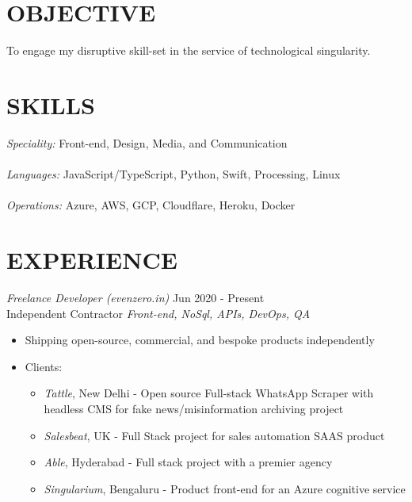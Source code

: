 \documentclass[margin, 10pt]{res} %
\begin{document}
\begin{resume}

\section{\ttfamily OBJECTIVE}  
To engage my disruptive skill-set in the service of technological singularity.

\section{\ttfamily \color{Black} SKILLS} 

{\sl Speciality:} Front-end, Design, Media, and Communication \\ \\
{\sl Languages:} JavaScript/TypeScript, Python, Swift, Processing, Linux\\ \\
{\sl Operations:} Azure, AWS, GCP, Cloudflare, Heroku, Docker


\section{\ttfamily EXPERIENCE}

{\sl Freelance Developer (evenzero.in)} \hfill Jun 2020 - \color{RubineRed} Present \color{Black}\\
  Independent Contractor \hfill {\scriptsize \it Front-end, NoSql, APIs, DevOps, QA}
\begin{itemize}
\item Shipping open-source, commercial, and bespoke products independently
\item Clients:
\begin{itemize}
\item {\sl Tattle}, New Delhi - Open source Full-stack WhatsApp Scraper with headless CMS for fake news/misinformation archiving project
\item {\sl Salesbeat}, UK - Full Stack project for sales automation SAAS product
\item {\sl Able}, Hyderabad - Full stack project with a premier agency
\item {\sl Singularium}, Bengaluru - Product front-end for an Azure cognitive service
\end{itemize}
\end{itemize}


\end{resume}
\end{document}
